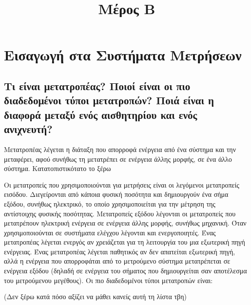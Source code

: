\documentclass{article}
\begin{document}
\title{Μέρος Β}
\author{}
\date{}

\maketitle

\section{Εισαγωγή στα Συστήματα Μετρήσεων}
\subsection{Τι είναι μετατροπέας? Ποιοί είναι οι πιο διαδεδομένοι τύποι μετατροπών? Ποιά είναι η διαφορά μεταξύ ενός αισθητηρίου και ενός ανιχνευτή?}
Μετατροπέας λέγεται η διάταξη που απορροφά ενέργεια από ένα σύστημα και την μεταφέρει, αφού συνήθως τη μετατρέπει σε ενέργεια άλλης μορφής, σε ένα άλλο σύστημα. Κατατοπιστικότατο το ξέρω

Οι μετατροπείς που χρησιμοποιούνται για μετρήσεις είναι οι λεγόμενοι μετατροπείς εισόδου. Διεγείρονται από κάποια φυσική ποσότητα και δημιουργούν ένα σήμα εξόδου, συνήθως
ηλεκτρικό, το οποίο χρησιμοποιείται για την μέτρηση της αντίστοιχης φυσικής ποσότητας. Μετατροπείς εξόδου λέγονται οι μετατροπείς που μετατρέπουν ηλεκτρική ενέργεια 
σε ενέργεια άλλης μορφής, συνήθως μηχανική. Όταν χρησιμοποιούνται σε συστήματα ελέγχου λέγονται και ενεργοποιητές. Ένας μετατροπέας λέγεται ενεργός αν χρειάζεται 
για τη λειτουργία του μια εξωτερική πηγή ενέργειας. Ένας μετατροπέας λέγεται παθητικός αν δεν απατείται εξωτερική πηγή, αλλά η ενέργεια που απορροφάται από το μετρούμενο
σύστημα μετατρέπεται σε ενέργεια εξόδου (δηλαδή σε ενέργεια του σήματος που δημιουργείται σαν αποτέλεσμα του μετρούμενου μεγέθους). Οι πιο διαδεδομένοι τύποι μετατροπών 
είναι:

(Δεν ξέρω κατά πόσο αξίζει να μάθει κανείς αυτή τη λίστα τβη)
\end{document}
